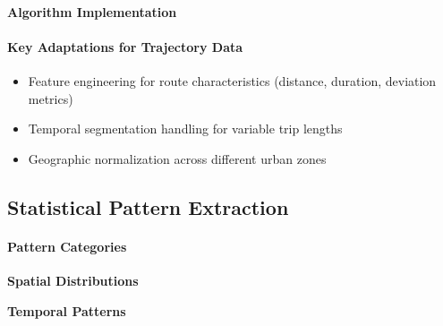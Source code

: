\documentclass[runningheads]{llncs}
\begin{document}

\paragraph{Algorithm Implementation}

\paragraph{Key Adaptations for Trajectory Data}
\begin{itemize}
\item Feature engineering for route characteristics (distance, duration, deviation metrics)
\item Temporal segmentation handling for variable trip lengths
\item Geographic normalization across different urban zones
\end{itemize}


\subsection{Statistical Pattern Extraction}
\label{sec:pattern-extraction}


\paragraph{Pattern Categories}

\textbf{Spatial Distributions}

\textbf{Temporal Patterns}
\end{document}
